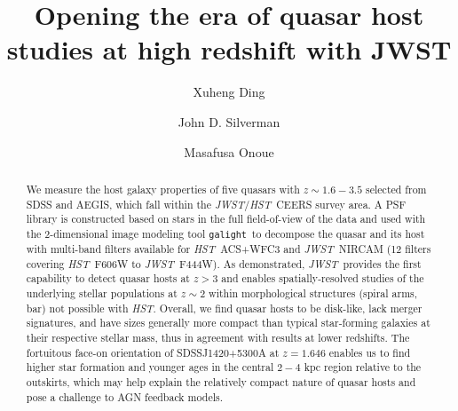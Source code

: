 \documentclass[twocolumn,]{aastex631}
\newcommand{\galight}{\texttt{galight}}
\newcommand{\hst}{{\it HST}}
\newcommand{\jwst}{{\it JWST}}
\begin{document}
\title{Opening the era of quasar host studies at high redshift with JWST}

\author[0000-0002-0786-7307]{Xuheng Ding}

\author[0000-0002-0000-6977]{John D. Silverman}

\author[0000-0003-2984-6803]{Masafusa Onoue}


\begin{abstract}
We measure the host galaxy properties of five quasars with $z\sim 1.6 - 3.5$ selected from SDSS and AEGIS, which fall within the \jwst/\hst\ CEERS survey area. A PSF library is constructed based on stars in the full field-of-view of the data and used with the 2-dimensional image modeling tool \galight\ to decompose the quasar and its host with multi-band filters available for \hst\ ACS+WFC3 and \jwst\ NIRCAM (12 filters covering \hst\ F606W to \jwst\ F444W). As demonstrated, \jwst\ provides the first capability to detect quasar hosts at $z>3$ and enables spatially-resolved studies of the underlying stellar populations at $z\sim2$ within morphological structures (spiral arms, bar) not possible with \hst. Overall, we find quasar hosts to be disk-like, lack merger signatures, and have sizes generally more compact than typical star-forming galaxies at their respective stellar mass, thus in agreement with results at lower redshifts. The fortuitous face-on orientation of SDSSJ1420+5300A at $z = 1.646$ enables us to find higher star formation and younger ages in the central $2-4$ kpc region relative to the outskirts, which may help explain the relatively compact nature of quasar hosts and pose a challenge to AGN feedback models.

\end{abstract}
\end{document}

